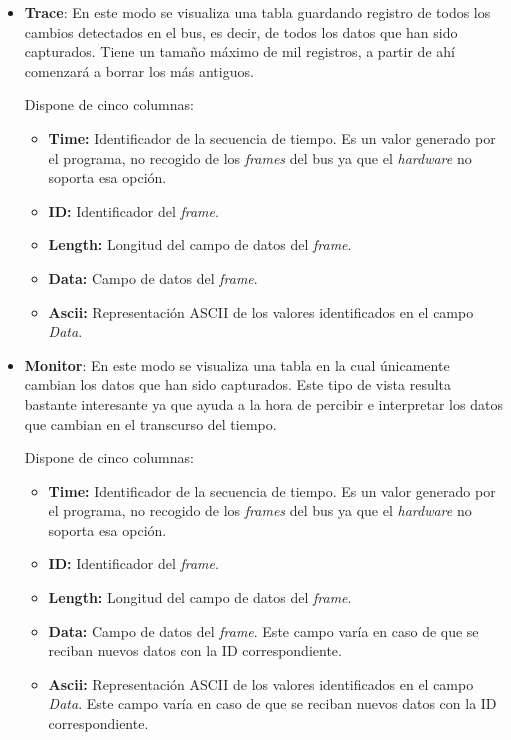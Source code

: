 \begin{itemize}
\item
\textbf{Trace}: En este modo se visualiza una tabla guardando registro de todos los cambios detectados en el bus, es decir, de todos los datos que han sido capturados. Tiene un tamaño máximo de mil registros, a partir de ahí comenzará a borrar los más antiguos.

Dispone de cinco columnas:
\begin{itemize}
\item
\textbf{Time:} Identificador de la secuencia de tiempo. Es un valor generado por el programa, no recogido de los \emph{frames} del bus ya que el \emph{hardware} no soporta esa opción.
\item
\textbf{ID:} Identificador del \emph{frame}.
\item
\textbf{Length:} Longitud del campo de datos del \emph{frame}.
\item
\textbf{Data:} Campo de datos del \emph{frame}.
\item
\textbf{Ascii:} Representación ASCII de los valores identificados en el campo \textit{Data}.
\end{itemize}



\item
\textbf{Monitor}: En este modo se visualiza una tabla en la cual únicamente cambian los datos que han sido capturados. Este tipo de vista resulta bastante interesante ya que ayuda a la hora de percibir e interpretar los datos que cambian en el transcurso del tiempo.

Dispone de cinco columnas:
\begin{itemize}
\item
\textbf{Time:} Identificador de la secuencia de tiempo. Es un valor generado por el programa, no recogido de los \emph{frames} del bus ya que el \emph{hardware} no soporta esa opción.
\item
\textbf{ID:} Identificador del \emph{frame}.
\item
\textbf{Length:} Longitud del campo de datos del \emph{frame}.
\item
\textbf{Data:} Campo de datos del \emph{frame}. Este campo varía en caso de que se reciban nuevos datos con la ID correspondiente.
\item
\textbf{Ascii:} Representación ASCII de los valores identificados en el campo \textit{Data}. Este campo varía en caso de que se reciban nuevos datos con la ID correspondiente.
\end{itemize}

\end{itemize}

